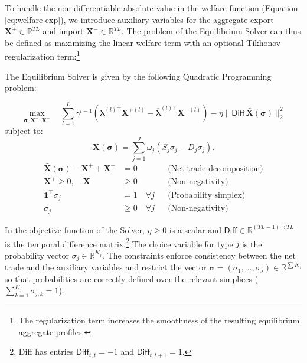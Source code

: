 \documentclass[12pt, notitlepage]{article}
\begin{document}
To handle the non-differentiable absolute value in the welfare function (Equation \ref{eq:welfare-exp}), we introduce auxiliary variables for the aggregate export $\mathbf{X}^{+} \in \mathbb{R}^{TL}$ and import $\mathbf{X}^{-} \in \mathbb{R}^{TL}$. The problem of the Equilibrium Solver can thus be defined as maximizing the linear welfare term with an optional Tikhonov regularization term:\footnote{The regularization term increases the smoothness of the resulting equilibrium aggregate profiles.}

\begin{definition}\label{eq_solver} The Equilibrium Solver is given by the following Quadratic Programming problem: 
    
\begin{equation}
\label{eq:planner-qp-types}
\max_{\boldsymbol{\sigma}, \mathbf{X}^+, \mathbf{X}^-} \quad \sum_{l=1}^L \gamma^{l-1} \left( \underline{\boldsymbol{\lambda}}^{(l)\top} \mathbf{X}^{+(l)} - \overline{\boldsymbol{\lambda}}^{(l)\top} \mathbf{X}^{-(l)} \right) - \eta \|\textsf{Diff} \, \bar{\mathbf{X}}(\boldsymbol{\sigma})\|_2^2
\end{equation}
subject to:
\begin{equation}
    \label{netput-aggregate}
\bar{\mathbf{X}}(\boldsymbol{\sigma}) = \sum_{j=1}^J \omega_j \left( S_j \sigma_j - D_j \sigma_j \right).
\end{equation}
\begin{align*}
\bar{\mathbf{X}}(\boldsymbol{\sigma}) - \mathbf{X}^+ + \mathbf{X}^- &= 0 && \text{(Net trade decomposition)} \\
\mathbf{X}^+ \ge 0, \quad \mathbf{X}^- &\ge 0 && \text{(Non-negativity)} \\
\mathbf{1}^\top \sigma_j &= 1 \quad \forall j && \text{(Probability simplex)} \\
\sigma_j &\ge 0 \quad \forall j && \text{(Non-negativity)}
\end{align*}

\end{definition}

\noindent{}In the objective function of the Solver, $\eta \geq 0$ is a scalar and $\textsf{Diff} \in \mathbb{R}^{(TL-1) \times TL}$ is the temporal difference matrix.\footnote{\textsf{Diff} has entries $\textsf{Diff}_{t,t} = -1$ and $\textsf{Diff}_{t,t+1} = 1$.}  The choice variable for type $j$ is the probability vector $\sigma_j \in \mathbb{R}^{K_j}$. The constraints enforce consistency between the net trade and the auxiliary variables and restrict the vector $\boldsymbol{\sigma} = (\sigma_1, \dots, \sigma_J) \in \mathbb{R}^{\sum K_j}$ so that  probabilities are correctly defined over the relevant simplices ($\sum_{k=1}^{K_j} \sigma_{j,k} = 1$). 
\end{document}
